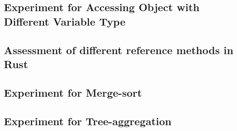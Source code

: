 
\subsection{Experiment for Accessing Object with Different Variable Type}
\label{sec:eval_diffval}

\clearpage

\subsection{Assessment of different reference methods in Rust}
\label{sec:eval_refcount}

\clearpage

\subsection{Experiment for Merge-sort}
\label{sec:eval_sort}

\clearpage

\subsection{Experiment for Tree-aggregation}
\label{sec:eval_treeagg}

\clearpage

% 